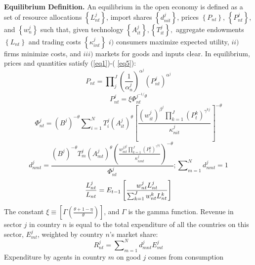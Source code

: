 \documentclass[12pt]{article}
\begin{document}
\textbf{Equilibrium Definition. }An equilibrium in the open economy is
defined as a set of resource allocations $\left\{ L_{nt}^{j}\right\} $,
import shares $\left\{ d_{nit}^{j}\right\} $, prices $\left\{ P_{nt}\right\} 
$, $\left\{ P_{nt}^{j}\right\} $, and $\left\{ w_{n}^{j}\right\} $ such
that, given technology $\left\{ A_{it}^{j}\right\} ,\left\{
T_{it}^{j}\right\} ,$ aggregate endowments $\left\{ L_{nt}\right\} $ and
trading costs $\left\{ \kappa _{int}^{j}\right\} $ $i)$ consumers maximize
expected utility, $ii)$ firms minimize costs, and $iii)$ markets for goods
and inputs clear. In equilibrium, prices and quantities satisfy (\ref{eq1})-(%
\ref{eq5}): 
\begin{equation}
P_{nt}=\prod\nolimits_{j}^{J}\left( \frac{1}{\alpha _{n}^{j}}\right)
^{\alpha ^{j}}\left( P_{nt}^{j}\right) ^{\alpha ^{j}}  \label{eq1}
\end{equation}%
\begin{equation}
P_{nt}^{j}=\xi \Phi _{nt}^{j^{-1/}\theta }  \label{eq2}
\end{equation}%
\begin{equation}
\Phi _{nt}^{j}=\left( B^{j}\right) ^{-\theta
}\sum\nolimits_{i=1}^{N}T_{i}^{j}\left( A_{it}^{j}\right) ^{\theta }\left[ 
\frac{\left( w_{it}^{j}\right) ^{\beta
^{j}}\prod_{k=1}^{J}(P_{t}^{k})^{\gamma ^{kj}}}{\kappa _{nit}^{j}}\right]
^{-\theta }  \label{eq3}
\end{equation}%
\begin{equation}
d_{nmt}^{j}=\frac{\left( B^{j}\right) ^{-\theta }T_{m}^{j}\left(
A_{mt}^{j}\right) ^{\theta }\left( \frac{w_{mt}^{j\beta
^{j}}\prod_{k=1}^{J}(P_{t}^{k})^{\gamma ^{kj}}}{\kappa _{nmt}^{j}}\right)
^{-\theta }}{\Phi _{nt}^{j}};\sum\nolimits_{m=1}^{N}d_{nmt}^{j}=1
\label{eq4}
\end{equation}%
\begin{equation}
\frac{L_{nt}^{j}}{L_{nt}}=E_{t-1}\left[ \frac{w_{nt}^{j}L_{nt}^{j}}{%
\sum_{k=1}^{J}w_{nt}^{k}L_{nt}^{k}}\right]   \label{eq7}
\end{equation}%
The constant $\xi \equiv \left[ \Gamma \left( \frac{\theta +1-\eta }{\theta }\right) %
\right]$, and $\Gamma $ is the gamma function.
Revenue in sector $j$ in country $n$ is equal to the total expenditure of
all the countries on this sector, $E_{mt}^{j}$, weighted by country $n$'s
market share: 
\begin{equation*}
R_{nt}^{j}=\sum\nolimits_{m=1}^{N}d_{mnt}^{j}E_{mt}^{j}
\end{equation*}%
Expenditure by agents in country $m$ on good $j$ comes from consumption
\end{document}
